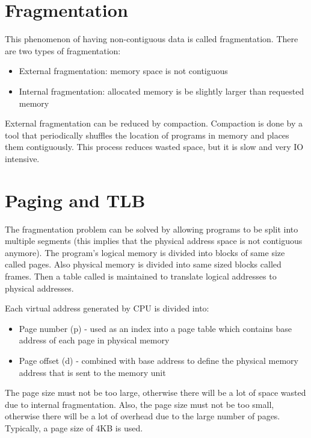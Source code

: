 \section{Fragmentation}
This phenomenon of having non-contiguous data is called fragmentation. There are two types of fragmentation:
\begin{itemize}
    \item External fragmentation: memory space is not contiguous
    \item Internal fragmentation: allocated memory is be slightly larger than requested memory
\end{itemize}


External fragmentation can be reduced by compaction. Compaction is done by a tool that periodically shuffles the location of programs in memory and places them contiguously. This process reduces wasted space, but it is slow and very IO intensive.

\section{Paging and TLB}
The fragmentation problem can be solved by allowing programs to be split into multiple segments (this implies that the physical address space is not contiguous anymore). The program's logical memory is divided into blocks of same size called pages. Also physical memory is divided into same sized blocks called frames. Then a table called  is maintained to translate logical addresses to physical addresses.


Each virtual address generated by CPU is divided into:
\begin{itemize}
    \item Page number (p) - used as an index into a page table which contains base address of each page in physical memory
    \item Page offset (d) - combined with base address to define the physical memory address that is sent to the memory unit
\end{itemize}

The page size must not be too large, otherwise there will be a lot of space wasted due to internal fragmentation. Also, the page size must not be too small, otherwise there will be a lot of overhead due to the large number of pages. Typically, a page size of 4KB is used.

